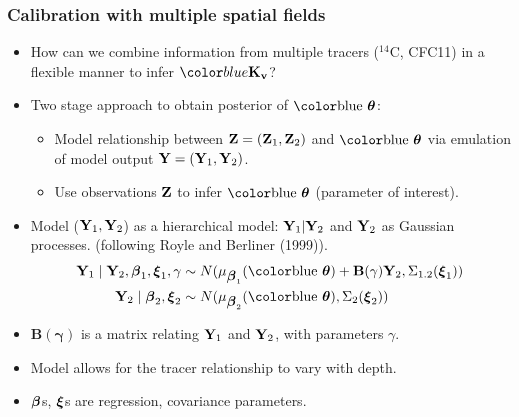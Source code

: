 \documentclass{beamer}
\begin{document}
\begin{frame}
  \frametitle{Calibration with multiple spatial fields  }
    \begin{itemize}
    \item How can we combine information from multiple tracers ($^{14}$C, CFC11) in a flexible manner to infer $\Kv$?
    \item Two stage approach to obtain posterior of $\bluebtheta$:
\begin{itemize} 
\item Model relationship between ${\bf Z}=({\bf Z}_1,{\bf Z}_2)$ and $\bluebtheta$ via emulation of model output ${\bf Y}=({\bf Y}_1,{\bf Y}_2)$.
\item Use observations ${\bf Z}$ to infer $\bluebtheta$
      (parameter of interest).
\end{itemize}
\item Model (${\bf Y}_1,{\bf Y}_2$) as a hierarchical model: ${\bf Y}_1| {\bf Y}_2$ and ${\bf Y}_2$ as Gaussian processes. (following Royle and Berliner (1999)).
\begin{equation*}\label{eq:inflikcovfun}
\begin{split} 
  \bY_1 \mid \bY_2, \bbeta_1,  \bxi_1, \mathbf{\gamma} & \sim  N(
  \mu_{\bbeta_1}(\bluebtheta)+\mathbf{B(\mathbf{\gamma})} \bY_2,\Sigma_{1.2}(\bxi_1)) \\
   \bY_2 \mid  \bbeta_2,  \bxi_2 & \sim  N(
  \mu_{\bbeta_2}(\bluebtheta),\Sigma_2(\bxi_2))\\
\end{split}
 \end{equation*}
\item $\mathbf{B(\mathbf{\gamma})} $ is a matrix relating ${\bf Y}_1$ and
  ${\bf Y}_2$, with parameters $\gamma$.
\item Model allows for the tracer relationship to vary with depth.
\item $\mbox{\boldmath $\beta$}$s, $\mbox{\boldmath $\xi$}$s are regression, covariance parameters.
          \end{itemize}
\end{frame}
\end{document}
